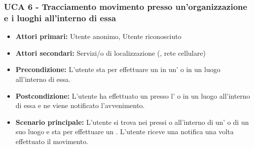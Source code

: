 \subsubsection{UCA 6 - Tracciamento movimento presso un'organizzazione e i luoghi all'interno di essa}%


\begin{itemize}
	\item \textbf{Attori primari:} Utente anonimo, Utente riconosciuto
	\item \textbf{Attori secondari:} Servizi/o di localizzazione (, rete cellulare)
	\item \textbf{Precondizione:} L'utente sta per effettuare un  in un' o in un luogo all'interno di essa.
	\item \textbf{Postcondizione:} L'utente ha effettuato un  presso l' o in un luogo all'interno di essa e ne viene notificato l'avvenimento. %
	\item \textbf{Scenario principale:} L'utente si trova nei pressi o all'interno di un' o di un suo luogo e sta per effettuare un . L'utente riceve una notifica una volta effettuato il movimento. %
\end{itemize}

